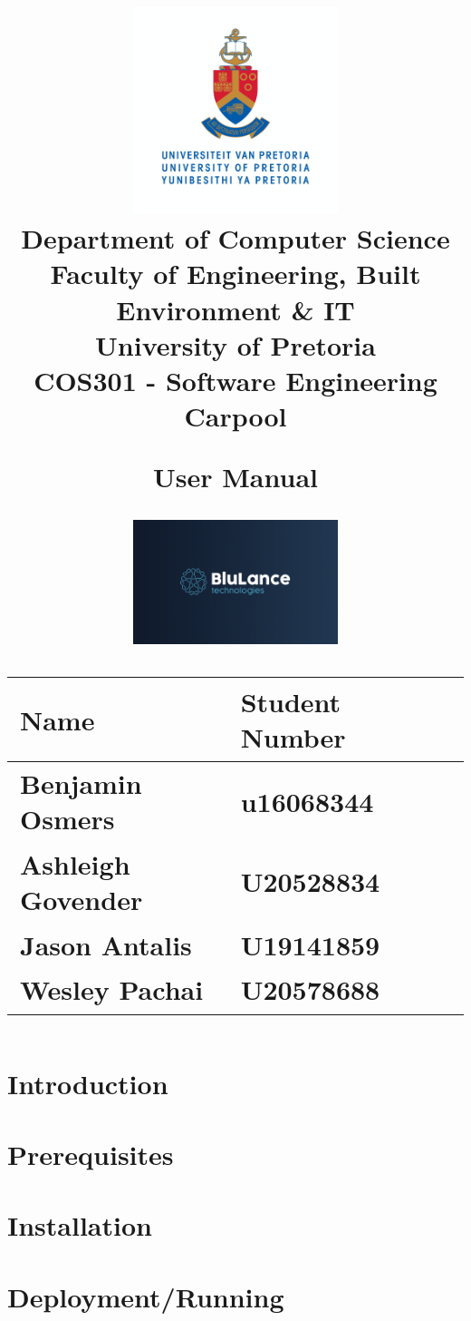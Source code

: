 \documentclass[hidelinks, 12pt, a4paper]{article}
\author{}
\date{}
\title
{
	\includegraphics[width=6cm]{images/up_logo.jpg} \\
	Department of Computer Science \\
	Faculty of Engineering, Built Environment \& IT\\
	University of Pretoria \\
	\vspace{0.5cm}
	\Huge COS301 -
	Software Engineering\\
	\vspace{1cm}
	{\Huge Carpool}\\
	\begin{Large}
	User Manual
	\end{Large}
	\vspace{0.5cm}
	
    \begin{center}
    \noindent
    \includegraphics[width=6cm]{images/company_logo.png} 
    \vspace{0.5cm}
    \begin{table}[h]
    \centering
    \begin{tabular}{|l|l|l|}
    \hline
    Name  & Student Number\\ \hline
    Benjamin Osmers & u16068344 \\ \hline
    Ashleigh Govender &  U20528834      \\ \hline
    Jason Antalis     & U19141859     \\ \hline
    Wesley Pachai & U20578688    \\ \hline
            
    \end{tabular}
    \end{table}
    \end{center}
    }
\begin{document}
\maketitle


\newpage
\tableofcontents
\newpage

\section{Introduction}

\section{Prerequisites}

\section{Installation}

\section{Deployment/Running}
\end{document}
